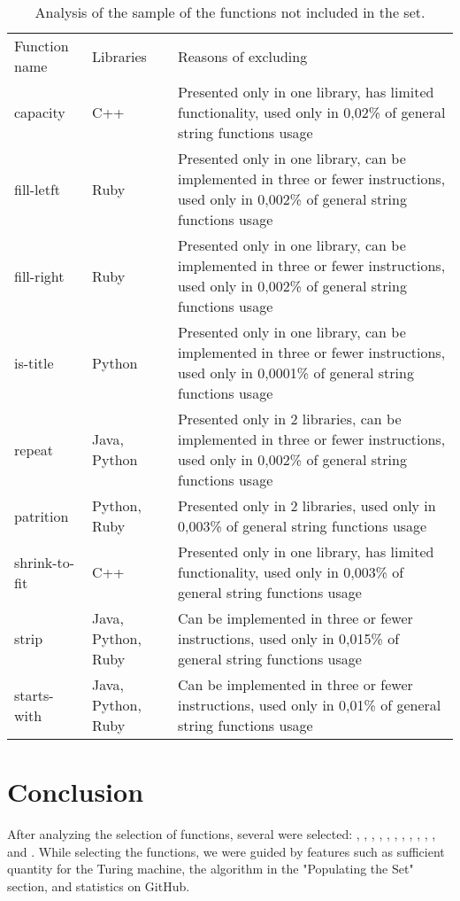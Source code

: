 \documentclass[11pt,nonacm,natbib=false]{acmart}
\begin{document}
\begin{table}
\begin{tabular}{l | l | p{265pt}}
Function name & Libraries          & Reasons of excluding                                                                                                                      \\
capacity      & C++                & Presented only in one library, has limited functionality, used only in 0,02\% of general string functions usage                           \\
fill-letft    & Ruby               & Presented only in one library, can be implemented in three or fewer instructions, used only in 0,002\% of general string functions usage  \\
fill-right    & Ruby               & Presented only in one library, can be implemented in three or fewer instructions, used only in 0,002\% of general string functions usage  \\
is-title      & Python             & Presented only in one library, can be implemented in three or fewer instructions, used only in 0,0001\% of general string functions usage \\
repeat        & Java, Python       & Presented only in 2 libraries, can be implemented in three or fewer instructions, used only in 0,002\% of general string functions usage  \\
patrition     & Python, Ruby       & Presented only in 2 libraries, used only in 0,003\% of general string functions usage                                                     \\
shrink-to-fit & C++                & Presented only in one library, has limited functionality, used only in 0,003\% of general string functions usage                          \\
strip         & Java, Python, Ruby & Can be implemented in three or fewer instructions, used only in 0,015\% of general string functions usage                                 \\
starts-with   & Java, Python, Ruby & Can be implemented in three or fewer instructions, used only in 0,01\% of general string functions usage                                 
\end{tabular}
\caption{\label{tab:excluded_functions}Analysis of the sample of the functions not included in the set.}
\end{table}

\section{Conclusion}
After analyzing the selection of functions, several were selected: , , , , , , , , , , , and . While selecting the functions, we were guided by features such as sufficient quantity for the Turing machine, the algorithm in the "Populating the Set" section, and statistics on GitHub. 
\end{document}
